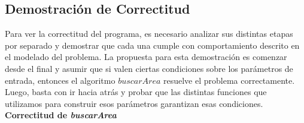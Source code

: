 \clearpage

\subsection{Demostración de Correctitud}

Para ver la correctitud del programa, es necesario analizar sus distintas etapas por separado y demostrar que cada una cumple con comportamiento descrito en el modelado del problema. La propuesta para esta demostración es comenzar desde el final y asumir que si valen ciertas condiciones sobre los parámetros de entrada, entonces el algoritmo $buscarArea$ resuelve el problema correctamente. Luego, basta con ir hacia atrás y probar que las distintas funciones que utilizamos para construir esos parámetros garantizan esas condiciones.\\

\textbf{Correctitud de \textit{buscarArea} }

